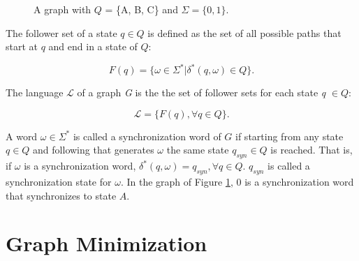 {\begin{figure}
\centering
{}
\caption{A graph with $Q$ = \{A, B, C\} and $\Sigma = \{0, 1\}$.\label{fig:graph}}
\end{figure}


\begin{definition}\label{def:followerset}
The follower set of a state $q \in Q$ is defined as the set of all possible paths that start at $q$ and end in a state of $Q$:
\end{definition}

\[ F(q) = \{\omega \in \Sigma^* | \delta^*(q, \omega) \in Q\}. \]


\begin{definition}\label{def:language}
The language $\mathcal{L}$ of a graph \textit{G} is the the set of follower sets for each state \textit{q} $\in Q$:
\end{definition}

\[ \mathcal{L} = \{F(\textit{q}), \forall \textit{q} \in Q\}. \]

A word $\omega \in \Sigma^*$ is called a synchronization word of $G$ if starting from any state $q \in Q$ and following that generates $\omega$ the same state $q_{syn} \in Q$ is reached. That is, if $\omega$ is a synchronization word, $\delta^*(q, \omega) = q_{syn}, \forall q \in Q$. $q_{syn}$ is called a synchronization state for $\omega$. In the graph of Figure \ref{fig:graph}, $0$ is a synchronization word that synchronizes to state $A$.

\section{Graph Minimization}

}
